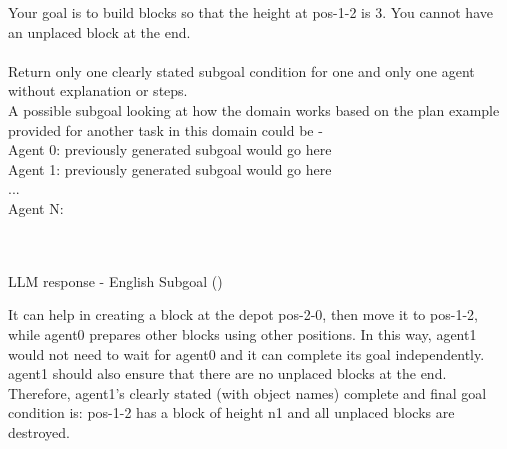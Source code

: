 \begin{tcolorbox}[redbox]
\begin{minipage}{0.95\columnwidth}
Your goal is to build blocks so that the height at pos-1-2 is 3. 
You cannot have an unplaced block at the end.
\\ \\
Return only one clearly stated subgoal condition for one and only one agent without explanation or steps. \\A possible subgoal looking at how the domain works based on the plan example provided for another task in this domain could be - \\ 
Agent 0: {previously generated subgoal would go here}\\
Agent 1: {previously generated subgoal would go here}
\\...\\
Agent N: 
\end{minipage}
\end{tcolorbox} \\ \\
LLM response - English Subgoal (\termes) \\
\begin{tcolorbox}[greenbox]
\begin{minipage}{0.95\columnwidth}
It can help in creating a block at the depot pos-2-0, then move it to pos-1-2, while agent0 prepares other blocks using other positions. In this way, agent1 would not need to wait for agent0 and it can complete its goal independently. agent1 should also ensure that there are no unplaced blocks at the end. Therefore, agent1's clearly stated (with object names) complete and final goal condition is: pos-1-2 has a block of height n1 and all unplaced blocks are destroyed.
\end{minipage}
\end{tcolorbox} \\ \\

